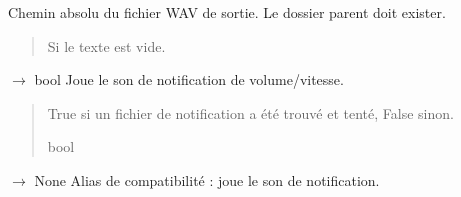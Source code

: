 \documentclass[letterpaper,10pt,french]{sphinxmanual}
\begin{document}
\begin{fulllineitems}
\begin{fulllineitems}
\begin{description}
\sphinxAtStartPar
Chemin absolu du fichier WAV de sortie.
Le dossier parent doit exister.

\end{description}
\begin{quote}\begin{description}
\sphinxAtStartPar
Si le texte est vide.

\end{description}\end{quote}

\end{fulllineitems}


\begin{fulllineitems}
\label{\detokenize{api/core:core.speaker.Speaker.play_notification}}
\pysigstartsignatures
\pysiglinewithargsret
{}
{}
{{ $\rightarrow$ bool}}
\pysigstopsignatures
\sphinxAtStartPar
Joue le son de notification de volume/vitesse.
\begin{quote}\begin{description}
\sphinxAtStartPar
True si un fichier de notification a été trouvé et tenté,
False sinon.

\sphinxAtStartPar
bool

\end{description}\end{quote}

\end{fulllineitems}


\begin{fulllineitems}
\label{\detokenize{api/core:core.speaker.Speaker.beep}}
\pysigstartsignatures
\pysiglinewithargsret
{}
{}
{{ $\rightarrow$ None}}
\pysigstopsignatures
\sphinxAtStartPar
Alias de compatibilité : joue le son de notification.


\end{fulllineitems}
\end{fulllineitems}
\end{document}
